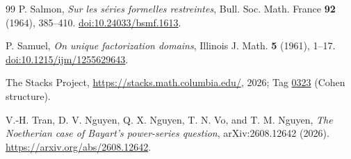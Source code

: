 \documentclass[11pt]{amsart}
\theoremstyle{remark}
\begin{document}
\begin{thebibliography}{99}
P. Salmon, \emph{Sur les s\'eries formelles restreintes},
Bull. Soc. Math. France \textbf{92} (1964), 385--410.
\href{https://doi.org/10.24033/bsmf.1613}{doi:10.24033/bsmf.1613}.

P. Samuel, \emph{On unique factorization domains},
Illinois J. Math. \textbf{5} (1961), 1--17.
\href{https://doi.org/10.1215/ijm/1255629643}{doi:10.1215/ijm/1255629643}.

The Stacks Project,
\url{https://stacks.math.columbia.edu/}, 2026;
Tag \href{https://stacks.math.columbia.edu/tag/0323}{0323}
(Cohen structure).

V.-H. Tran, D. V. Nguyen, Q. X. Nguyen, T. N. Vo, and T. M. Nguyen,
\emph{The Noetherian case of Bayart's power-series question},
arXiv:2608.12642 (2026).
\url{https://arxiv.org/abs/2608.12642}.
\end{thebibliography}
\end{document}
